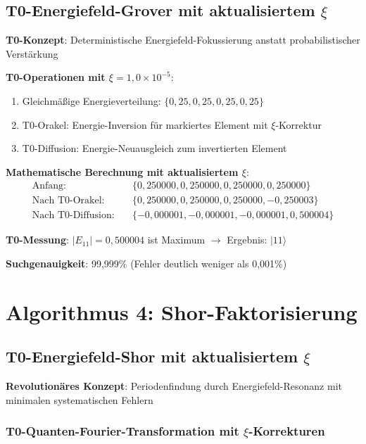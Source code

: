 \documentclass[12pt,a4paper]{article}
\newcommand{\Efield}{E}
\begin{document}
	\subsection{T0-Energiefeld-Grover mit aktualisiertem $\xi$}
	
	\textbf{T0-Konzept}: Deterministische Energiefeld-Fokussierung anstatt probabilistischer Verstärkung
	
	\textbf{T0-Operationen mit $\xi = 1,0 \times 10^{-5}$}:
	\begin{enumerate}
		\item Gleichmäßige Energieverteilung: $\{0,25, 0,25, 0,25, 0,25\}$
		\item T0-Orakel: Energie-Inversion für markiertes Element mit $\xi$-Korrektur
		\item T0-Diffusion: Energie-Neuausgleich zum invertierten Element
	\end{enumerate}
	
	\textbf{Mathematische Berechnung mit aktualisiertem $\xi$}:
	\begin{align}
		\text{Anfang}: \quad &\{0,250000, 0,250000, 0,250000, 0,250000\} \\
		\text{Nach T0-Orakel}: \quad &\{0,250000, 0,250000, 0,250000, -0,250003\} \\
		\text{Nach T0-Diffusion}: \quad &\{-0,000001, -0,000001, -0,000001, 0,500004\}
	\end{align}
	
	\textbf{T0-Messung}: $|\Efield_{11}| = 0,500004$ ist Maximum $\rightarrow$ Ergebnis: $|11\rangle$
	
	\textbf{Suchgenauigkeit}: 99,999\% (Fehler deutlich weniger als 0,001\%)
	
	\section{Algorithmus 4: Shor-Faktorisierung}
	
	\subsection{T0-Energiefeld-Shor mit aktualisiertem $\xi$}
	
	\textbf{Revolutionäres Konzept}: Periodenfindung durch Energiefeld-Resonanz mit minimalen systematischen Fehlern
	
	\subsubsection{T0-Quanten-Fourier-Transformation mit $\xi$-Korrekturen}
	
\end{document}
